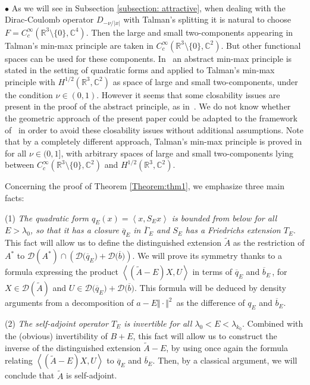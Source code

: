 \documentclass[12pt,reqno]{amsart}
\newcommand{\innerproduct}[2]{\left\langle #1, #2 \right\rangle}
\newcommand{\R}{{\mathbb R}}
\newcommand{\C}{{\mathbb C}}
\renewcommand{\(}{\left(}
\renewcommand{\)}{\right)}
\begin{document}
\\[2pt] $\bullet$ As we will see in Subsection \ref{subsection: attractive}, when dealing with the Dirac-Coulomb operator $D_{-\nu/|x|}$ with Talman's splitting it is natural to choose $F=C^\infty_c(\R^3\setminus\{0\},\C^4)$. Then the large and small two-components appearing in Talman's min-max principle are taken in $C^\infty_c(\R^3\setminus\{0\},\C^2)$. But other functional spaces can be used for these components. In~\cite{MorMul-15,M16} an abstract min-max principle is stated in the setting of quadratic forms and applied to Talman's min-max principle with $H^{1/2}(\R^3,\C^2)$ as space of large and small two-components, under the condition $\nu\in\left(0,1\right)$. However it seems that some closability issues are present in the proof of the abstract principle, as in~\cite{DES00a}. We do not know whether the geometric approach of the present paper could be adapted to the framework of~\cite{MorMul-15} in order to avoid these closability issues without additional assumptions. Note that by a completely different approach, Talman's min-max principle is proved in \cite{ELS19} for all $\nu\in (0,1]$, with arbitrary spaces of large and small two-components lying between $C^\infty_c(\R^3\setminus\{0\},\C^2)$ and $H^{1/2}(\R^3,\C^2)$.\medskip

\noindent Concerning the proof of Theorem \ref{Theorem:thm1}, we emphasize three main facts:

\noindent
(1) {\it The quadratic form $q_E(x)=\innerproduct{x}{S_Ex}$ is bounded from below for all $E>\lambda_0$, so that it has a closure $\overline{q}_E$ in $\overline{\Gamma}_E$ and $S_E$ has a Friedrichs extension $T_E$}. This fact will allow us to define the distinguished extension $\widetilde A$ as the restriction of $A^*$ to $\mathcal D(A^*)\cap\(\mathcal D\big(\overline{q}_E\big)+\mathcal D\big(\overline{b}\big)\)$. We will prove its symmetry thanks to a formula expressing the product $\innerproduct{\(\widetilde A-E\)X}{U}$ in terms of $\overline{q}_E$ and $\overline{b}_E\,$, for $X\in \mathcal D(\widetilde A)$ and $U\in \mathcal D\big(\overline{q}_E\big)+\mathcal D\big(\overline{b}\big)$. This formula will be deduced by density arguments from a decomposition of $a-E\Vert\cdot\Vert^2\,$ as the difference of ${q}_E$ and $\overline{b}_E$.

\noindent
(2) {\it The self-adjoint operator $T_E$ is invertible for all $\lambda_0<E<\lambda_{k_0}$}. Combined with the (obvious) invertibility of $B+E$, this fact will allow us to construct the inverse of the distinguished extension $\widetilde A-E$, by using once again the formula relating $\innerproduct{\(\widetilde A-E\)X}{U}$ to $\overline{q}_E$ and $\overline{b}_E$. Then, by a classical argument, we will conclude that $\widetilde A$ is self-adjoint.
\end{document}

